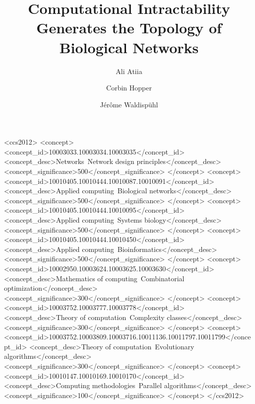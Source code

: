 \documentclass[sigconf]{acmart}
\begin{document}
\title{Computational Intractability Generates the Topology of Biological Networks}


\author{Ali Atiia}
\author{Corbin Hopper}

\author{Jérôme Waldispühl}

\renewcommand{\shortauthors}{Atiia et al.}


 \begin{CCSXML}
<ccs2012>
<concept>
<concept_id>10003033.10003034.10003035</concept_id>
<concept_desc>Networks~Network design principles</concept_desc>
<concept_significance>500</concept_significance>
</concept>
<concept>
<concept_id>10010405.10010444.10010087.10010091</concept_id>
<concept_desc>Applied computing~Biological networks</concept_desc>
<concept_significance>500</concept_significance>
</concept>
<concept>
<concept_id>10010405.10010444.10010095</concept_id>
<concept_desc>Applied computing~Systems biology</concept_desc>
<concept_significance>500</concept_significance>
</concept>
<concept>
<concept_id>10010405.10010444.10010450</concept_id>
<concept_desc>Applied computing~Bioinformatics</concept_desc>
<concept_significance>500</concept_significance>
</concept>
<concept>
<concept_id>10002950.10003624.10003625.10003630</concept_id>
<concept_desc>Mathematics of computing~Combinatorial optimization</concept_desc>
<concept_significance>300</concept_significance>
</concept>
<concept>
<concept_id>10003752.10003777.10003778</concept_id>
<concept_desc>Theory of computation~Complexity classes</concept_desc>
<concept_significance>300</concept_significance>
</concept>
<concept>
<concept_id>10003752.10003809.10003716.10011136.10011797.10011799</concept_id>
<concept_desc>Theory of computation~Evolutionary algorithms</concept_desc>
<concept_significance>300</concept_significance>
</concept>
<concept>
<concept_id>10010147.10010169.10010170</concept_id>
<concept_desc>Computing methodologies~Parallel algorithms</concept_desc>
<concept_significance>100</concept_significance>
</concept>
</ccs2012>
\end{CCSXML}
\end{document}
